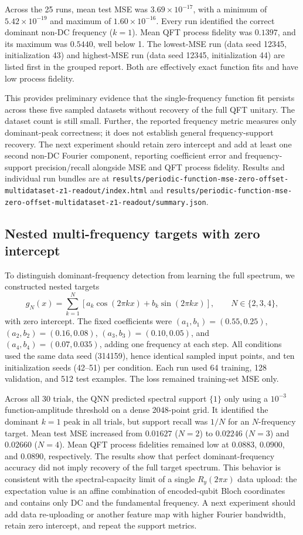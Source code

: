 \documentclass[11pt]{article}
\begin{document}
Across the 25 runs, mean test MSE was $3.69\times10^{-17}$, with a minimum of $5.42\times10^{-19}$ and maximum of $1.60\times10^{-16}$. Every run identified the correct dominant non-DC frequency ($k=1$). Mean QFT process fidelity was $0.1397$, and its maximum was $0.5440$, well below 1. The lowest-MSE run (data seed 12345, initialization 43) and highest-MSE run (data seed 12345, initialization 44) are listed first in the grouped report. Both are effectively exact function fits and have low process fidelity.

This provides preliminary evidence that the single-frequency function fit persists across these five sampled datasets without recovery of the full QFT unitary. The dataset count is still small. Further, the reported frequency metric measures only dominant-peak correctness; it does not establish general frequency-support recovery. The next experiment should retain zero intercept and add at least one second non-DC Fourier component, reporting coefficient error and frequency-support precision/recall alongside MSE and QFT process fidelity. Results and individual run bundles are at \texttt{results/periodic-function-mse-zero-offset-multidataset-z1-readout/index.html} and \texttt{results/periodic-function-mse-zero-offset-multidataset-z1-readout/summary.json}.

\subsection{Nested multi-frequency targets with zero intercept}

To distinguish dominant-frequency detection from learning the full spectrum, we constructed nested targets
\begin{equation}
  g_N(x)=\sum_{k=1}^{N}\left[a_k\cos(2\pi kx)+b_k\sin(2\pi kx)\right], \qquad N\in\{2,3,4\},
\end{equation}
with zero intercept. The fixed coefficients were $(a_1,b_1)=(0.55,0.25)$, $(a_2,b_2)=(0.16,0.08)$, $(a_3,b_3)=(0.10,0.05)$, and $(a_4,b_4)=(0.07,0.035)$, adding one frequency at each step. All conditions used the same data seed (314159), hence identical sampled input points, and ten initialization seeds (42--51) per condition. Each run used 64 training, 128 validation, and 512 test examples. The loss remained training-set MSE only.

Across all 30 trials, the QNN predicted spectral support $\{1\}$ only using a $10^{-3}$ function-amplitude threshold on a dense 2048-point grid. It identified the dominant $k=1$ peak in all trials, but support recall was $1/N$ for an $N$-frequency target. Mean test MSE increased from $0.01627$ ($N=2$) to $0.02246$ ($N=3$) and $0.02660$ ($N=4$). Mean QFT process fidelities remained low at $0.0883$, $0.0900$, and $0.0890$, respectively. The results show that perfect dominant-frequency accuracy did not imply recovery of the full target spectrum. This behavior is consistent with the spectral-capacity limit of a single $R_y(2\pi x)$ data upload: the expectation value is an affine combination of encoded-qubit Bloch coordinates and contains only DC and the fundamental frequency. A next experiment should add data re-uploading or another feature map with higher Fourier bandwidth, retain zero intercept, and repeat the support metrics.
\end{document}
